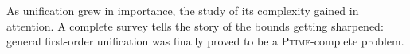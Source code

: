 







As unification grew in importance, the study of its complexity gained in attention.
A complete survey \cite{knight_unification_1989} tells the story of the bounds getting sharpened: general first-order unification was finally proved \cite{dwork_sequential_1984} to be a \textsc{Ptime}-complete problem.

